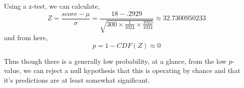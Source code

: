 \par Using a z-test, we can calculate,
$$ Z = \frac{score - \mu}{\sigma} = \frac{18 - .2929}{\sqrt{300\times \frac{1}{1024} \times \frac{1023}{1024}}} \approx 32.7300950233 $$
and from here, 
$$ p = 1 - CDF(Z) \approx 0$$

Thus though there is a generally low probability, at a glance, from the low $p$-value, we can reject a null hypothesis that this is operating by chance and that it's predictions are at least somewhat significant. 















